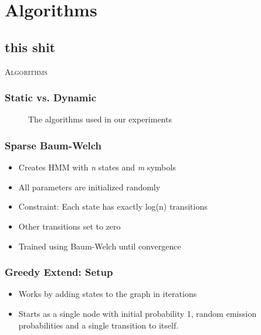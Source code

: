 \section{Algorithms}
\subsection{this shit}

\begin{frame}
\center \huge \scshape Algorithms
\end{frame}

\begin{frame}
  \frametitle{Static vs. Dynamic} 
\begin{center}
\begin{figure}[!h]
\caption{The algorithms used in our experiments}
\label{fig:alg-hierarchy}
\end{figure}
\end{center}
    
\end{frame}

\begin{frame}
  \frametitle{Sparse Baum-Welch}
  \begin{itemize}
  	\item Creates HMM with \emph{n} states and \emph{m} symbols
  	\item All parameters are initialized randomly
  	\item Constraint: Each state has exactly log(n) transitions
  	\item Other transitions set to zero
  	\item Trained using Baum-Welch until convergence
  \end{itemize}
\end{frame}

\begin{frame}
  \frametitle{Greedy Extend: Setup} 

	\begin{itemize}
		\item Works by adding states to the graph in iterations
		\item Starts as a single node with initial probability 1, random emission probabilities and a single transition to itself. 
	\end{itemize}
  
\end{frame}

